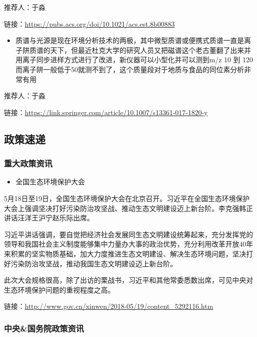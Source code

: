 \documentclass[]{book}
\providecommand{\tightlist}{%
  \setlength{\itemsep}{0pt}\setlength{\parskip}{0pt}}
\begin{document}
推荐人：于淼

链接：\url{https://pubs.acs.org/doi/10.1021/acs.est.8b00883}

\begin{itemize}
\tightlist
\item
  质谱与光源是现在环境分析技术的两极，其中微型质谱或便携式质谱一直是离子阱质谱的天下，但最近杜克大学的研究人员又把磁谱这个老古董翻了出来并用离子同步进样方式进行了改进，新仪器可以小型化并可以测到m/z 10 到 120而离子阱一般低于50就测不到了，这个质量段对于地质与食品的同位素分析非常有用
\end{itemize}

推荐人：于淼

链接：\url{https://link.springer.com/article/10.1007/s13361-017-1820-y}

\hypertarget{ux653fux7b56ux901fux9012-1}{%
\subsection*{政策速递}\label{ux653fux7b56ux901fux9012-1}}

\hypertarget{ux91cdux5927ux653fux7b56ux8d44ux8baf-1}{%
\subsubsection*{重大政策资讯}\label{ux91cdux5927ux653fux7b56ux8d44ux8baf-1}}

\begin{itemize}
\tightlist
\item
  全国生态环境保护大会
\end{itemize}

5月18日至19日，全国生态环境保护大会在北京召开。习近平在全国生态环境保护大会上强调坚决打好污染防治攻坚战、推动生态文明建设迈上新台阶。李克强韩正讲话汪洋王沪宁赵乐际出席。

习近平讲话强调，要自觉把经济社会发展同生态文明建设统筹起来，充分发挥党的领导和我国社会主义制度能够集中力量办大事的政治优势，充分利用改革开放40年来积累的坚实物质基础，加大力度推进生态文明建设、解决生态环境问题，坚决打好污染防治攻坚战，推动我国生态文明建设迈上新台阶。

此次大会规格很高，除了出访的栗战书，习近平和其他常委悉数出席，可见中央对生态环境保护问题的重视程度之高。

链接：\url{http://www.gov.cn/xinwen/2018-05/19/content_5292116.htm}

\hypertarget{ux4e2dux592eux56fdux52a1ux9662ux653fux7b56ux8d44ux8baf-1}{%
\subsubsection*{中央\&国务院政策资讯}\label{ux4e2dux592eux56fdux52a1ux9662ux653fux7b56ux8d44ux8baf-1}}
\end{document}
